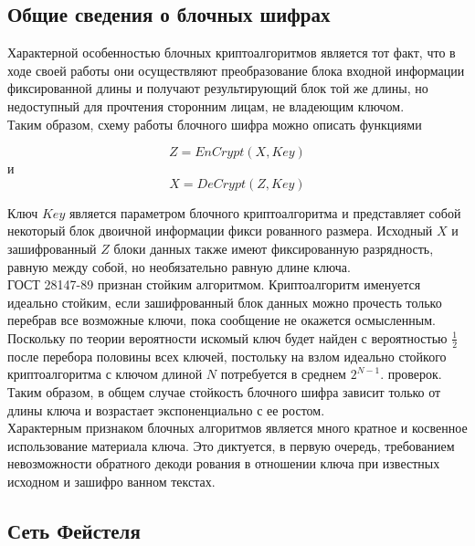 \documentclass[oneside,final,14pt]{extreport}
\begin{document}
\begin{center}
\subsection{Общие сведения о блочных шифрах}
 \end{center}


Характерной особенностью блочных криптоалгоритмов
является тот факт, что в ходе своей работы они осуществляют
преобразование блока входной информации фиксированной длины и
получают результирующий блок той же длины, но недоступный для
прочтения сторонним лицам, не владеющим ключом. \\


Таким образом,
схему работы блочного шифра можно описать функциями

\[Z = EnCrypt(X, Key)\]
и
\[X = DeCrypt(Z, Key)\]

Ключ $Key$ является параметром блочного криптоалгоритма и
представляет собой некоторый блок двоичной информации фикси­
рованного размера. Исходный $X$ и зашифрованный $Z$ блоки данных
также имеют фиксированную разрядность, равную между собой, но
необязательно равную длине ключа.\\


ГОСТ 28147-89 признан стойким алгоритмом.  Криптоалгоритм именуется идеально стойким, если зашифро­ванный блок данных можно прочесть только перебрав все возможные ключи, пока сообщение не окажется осмысленным. \\

Поскольку по теории вероятности искомый ключ будет найден с вероятностью $\frac{1}{2}$
после перебора половины всех ключей, постольку на взлом идеально
стойкого криптоалгоритма с ключом длиной $N$ потребуется в среднем $2^{N - 1}$. проверок. Таким образом, в общем случае стойкость блочного шифра зависит только от длины ключа и возрастает экспоненциально с ее ростом. \\


Характерным признаком блочных алгоритмов является много­ кратное и косвенное использование материала ключа. Это диктуется,
в первую очередь, требованием невозможности обратного декоди­
рования в отношении ключа при известных исходном и зашифро­
ванном текстах.\\


\subsection{Сеть Фейстеля}
\end{document}
